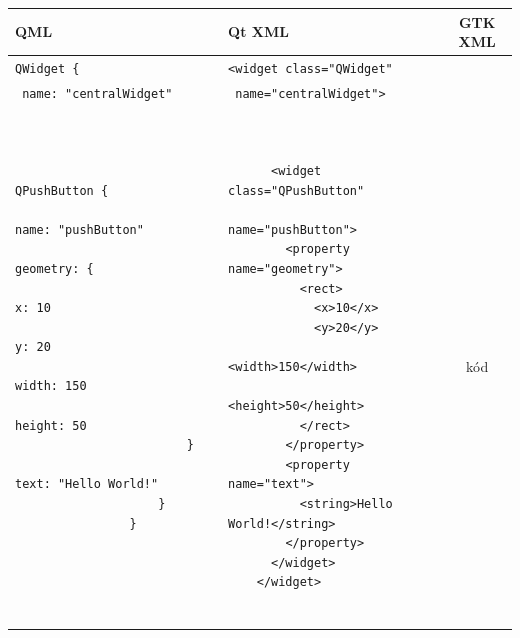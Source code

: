 \begin{landscape}
	\begin{tabular}{|l|l|c|}
		\hline
		QML & Qt XML & GTK XML \\
		\hline
		\texttt{QWidget \{} & \texttt{<widget class="QWidget"} & \\
		    \texttt{        name: "centralWidget"} & \texttt{        name="centralWidget">} & \\
		\begin{minipage}{0.24\linewidth}
			\begin{verbatim}
				    

				    QPushButton {
				        name: "pushButton"
				            geometry: {
				            x: 10
				            y: 20
				            width: 150
				            height: 50
				        }
				        text: "Hello World!"
				    }
				}
				
				
				
				
			\end{verbatim}
		\end{minipage}
		 & 
		 	\begin{minipage}{0.3\linewidth}
		 	\begin{verbatim}
		 		
	
	  <widget class="QPushButton"
	          name="pushButton">
	    <property name="geometry">
	      <rect>
	        <x>10</x>
	        <y>20</y>
	        <width>150</width>
	        <height>50</height>
	      </rect>
	    </property>
	    <property name="text">
	      <string>Hello World!</string>
	    </property>
	  </widget>
	</widget>
		
		 	\end{verbatim}
		 \end{minipage}
		 & kód \\
		\hline
	\end{tabular}
\end{landscape}
